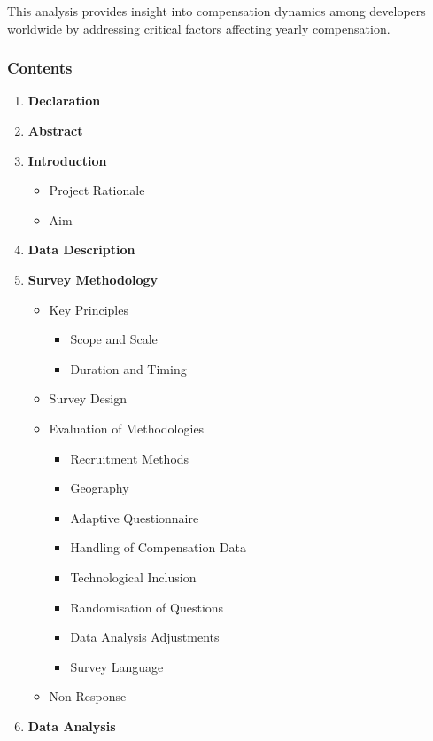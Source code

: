 \documentclass[
  12pt,
]{article}
\providecommand{\tightlist}{%
  \setlength{\itemsep}{0pt}\setlength{\parskip}{0pt}}
\begin{document}
This analysis provides insight into compensation dynamics among
developers worldwide by addressing critical factors affecting yearly
compensation.

\hypertarget{contents}{%
\subsubsection{Contents}\label{contents}}

\begin{enumerate}
\def\labelenumi{\arabic{enumi}.}
\tightlist
\item
  \textbf{Declaration}
\item
  \textbf{Abstract}
\item
  \textbf{Introduction}

  \begin{itemize}
  \tightlist
  \item
    Project Rationale
  \item
    Aim
  \end{itemize}
\item
  \textbf{Data Description}
\item
  \textbf{Survey Methodology}

  \begin{itemize}
  \tightlist
  \item
    Key Principles

    \begin{itemize}
    \tightlist
    \item
      Scope and Scale
    \item
      Duration and Timing
    \end{itemize}
  \item
    Survey Design
  \item
    Evaluation of Methodologies

    \begin{itemize}
    \tightlist
    \item
      Recruitment Methods
    \item
      Geography
    \item
      Adaptive Questionnaire
    \item
      Handling of Compensation Data
    \item
      Technological Inclusion
    \item
      Randomisation of Questions
    \item
      Data Analysis Adjustments
    \item
      Survey Language
    \end{itemize}
  \item
    Non-Response
  \end{itemize}
\item
  \textbf{Data Analysis}


\end{enumerate}
\end{document}

